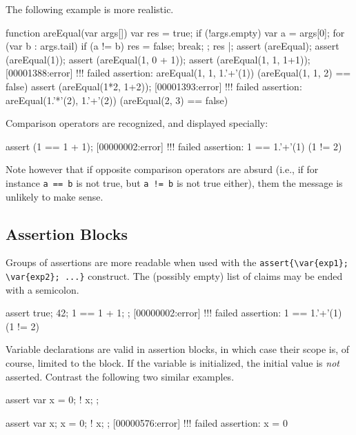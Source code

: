The following example is more realistic.

\begin{urbiscript}
function areEqual(var args[])
{
  var res = true;
  if (!args.empty)
  {
    var a = args[0];
    for (var b : args.tail)
      if (a != b)
      {
        res = false;
        break;
      }
  };
  res
}|;
assert (areEqual);
assert (areEqual(1));
assert (areEqual(1, 0 + 1));
assert (areEqual(1, 1, 1+1));
[00001388:error] !!! failed assertion: areEqual(1, 1, 1.'+'(1)) (areEqual(1, 1, 2) == false)
assert (areEqual(1*2, 1+2));
[00001393:error] !!! failed assertion: areEqual(1.'*'(2), 1.'+'(2)) (areEqual(2, 3) == false)
\end{urbiscript}

Comparison operators are recognized, and displayed specially:
\begin{urbiscript}
assert (1 == 1 + 1);
[00000002:error] !!! failed assertion: 1 == 1.'+'(1) (1 != 2)
\end{urbiscript}

Note however that if opposite comparison operators are absurd (i.e., if for
instance \lstinline|a == b| is not true, but \lstinline|a != b| is not true
either), them the message is unlikely to make sense.

\subsection{Assertion Blocks}

Groups of assertions are more readable when used with the
\lstinline|assert{\var{exp1}; \var{exp2}; ...}| construct.  The (possibly
empty) list of claims may be ended with a semicolon.

\begin{urbiscript}
assert
{
  true;
  42;
  1 == 1 + 1;
};
[00000002:error] !!! failed assertion: 1 == 1.'+'(1) (1 != 2)
\end{urbiscript}

Variable declarations are valid in assertion blocks, in which case their
scope is, of course, limited to the block.  If the variable is initialized,
the initial value is \emph{not} asserted.  Contrast the following two
similar examples.

\begin{urbiscript}
assert
{
  var x = 0;
  ! x;
};

assert
{
  var x;
  x = 0;
  ! x;
};
[00000576:error] !!! failed assertion: x = 0
\end{urbiscript}

